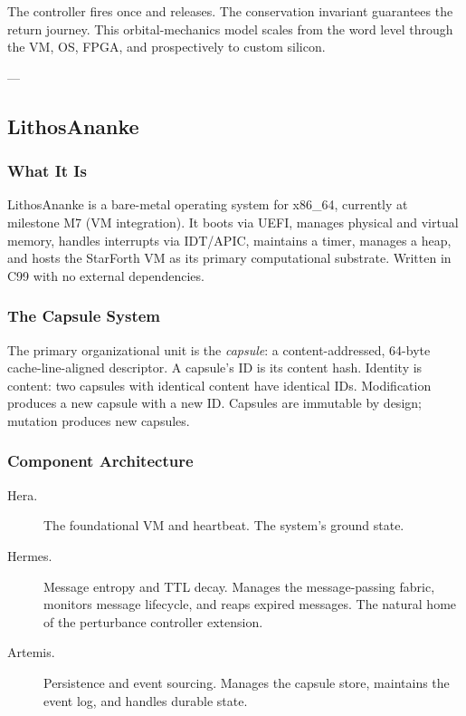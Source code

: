 The controller fires once and releases. The conservation invariant guarantees
the return journey. This orbital-mechanics model scales from the word level
through the VM, OS, FPGA, and prospectively to custom silicon.

---

\subsection{LithosAnanke}

\subsubsection{What It Is}

LithosAnanke is a bare-metal operating system for x86\_64, currently at
milestone M7 (VM integration). It boots via UEFI, manages physical and
virtual memory, handles interrupts via IDT/APIC, maintains a timer, manages
a heap, and hosts the StarForth VM as its primary computational substrate.
Written in C99 with no external dependencies.

\subsubsection{The Capsule System}

The primary organizational unit is the \emph{capsule}: a content-addressed,
64-byte cache-line-aligned descriptor. A capsule's ID is its content hash.
Identity is content: two capsules with identical content have identical IDs.
Modification produces a new capsule with a new ID. Capsules are immutable by
design; mutation produces new capsules.

\subsubsection{Component Architecture}

\begin{description}
  \item[Hera.] The foundational VM and heartbeat. The system's ground state.
  \item[Hermes.] Message entropy and TTL decay. Manages the message-passing
        fabric, monitors message lifecycle, and reaps expired messages. The
        natural home of the perturbance controller extension.
  \item[Artemis.] Persistence and event sourcing. Manages the capsule store,
        maintains the event log, and handles durable state.
\end{description}

